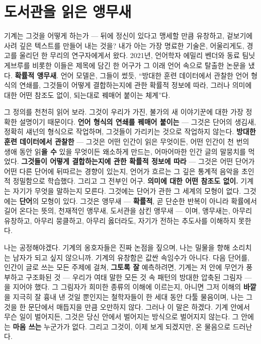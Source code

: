 \section*{도서관을 읽은 앵무새}

기계는 그것을 어떻게 하는가 — 뒤에 정신이 있다고 맹세할 만큼 유창하고, 겉보기에 사려 깊은 텍스트를 만들어 내는 것을? 내가 아는 가장 명료한 기술은, 어울리게도, 경고를 울리던 한 무리의 연구자에게서 왔다. 2021년, 언어학자 에밀리 벤더와 동료 팀닛 게브루를 비롯한 이들은 제목에 담긴 한 어구가 그 이래 언어 속으로 탈출한 논문을 냈다. \textbf{확률적 앵무새}. 언어 모델은, 그들이 썼듯, ``방대한 훈련 데이터에서 관찰한 언어 형식의 연쇄를, 그것들이 어떻게 결합하는지에 관한 확률적 정보에 따라, 그러나 의미에 대한 어떤 참조도 없이, 되는대로 꿰매어 붙이는 체계''다.

그 정의를 천천히 읽어 보라. 그것이 우리가 가진, 불가의 새 이야기꾼에 대한 가장 정확한 설명이기 때문이다. \textbf{언어 형식의 연쇄를 꿰매어 붙이는} — 그것은 단어의 생김새, 정확히 섀넌의 형식으로 작업하며, 그것들이 가리키는 것으로 작업하지 않는다. \textbf{방대한 훈련 데이터에서 관찰한} — 그것은 어떤 인간이 읽은 무엇이든, 어떤 인간이 천 번의 생애 동안 읽\textbf{을 수} 있을 무엇이든 왜소하게 만드는, 어마어마한 인간 글의 말뭉치를 먹었다. \textbf{그것들이 어떻게 결합하는지에 관한 확률적 정보에 따라} — 그것은 어떤 단어가 어떤 다른 단어에 뒤따르는 경향이 있는지, 언어가 흐르는 그 깊은 통계적 음악을 초인적 정밀함으로 학습했다. 그리고 그 전부인 어구. \textbf{의미에 대한 어떤 참조도 없이.} 기계는 자기가 무엇을 말하는지 모른다. 그것에는 단어가 관한 그 세계의 모형이 없다. 그것에는 \textbf{단어}의 모형이 있다. 그것은 앵무새 — \textbf{확률적}, 곧 단순한 반복이 아니라 확률에서 길어 온다는 뜻의, 천재적인 앵무새, 도서관을 삼킨 앵무새 — 이며, 앵무새는, 아무리 유창하고, 아무리 뭉클하고, 아무리 옳더라도, 자기가 전하는 추도사를 이해하지 못한다.

나는 공정해야겠다. 기계의 옹호자들은 진짜 논점을 짚으며, 나는 밀물을 향해 소리치는 남자가 되고 싶지 않으니까. 기계의 유창함은 값싼 속임수가 아니다. 다음 단어를, 인간이 글로 쓰는 모든 주제에 걸쳐, \textbf{그토록 잘} 예측하려면, 기계는 저 안에 무언가 풍부하고 구조화된 것 — 우리가 여태 말한 모든 것 속 패턴의 방대한 압축된 그림자 — 을 지어야 했다. 그 그림자가 희미한 종류의 이해에 이르는지, 아니면 그저 이해의 \textbf{바깥}을 지극히 잘 흉내 낸 것일 뿐인지는 철학자들이 한 세대 동안 다툴 물음이며, 나는 그것을 한 문단에서 매듭지을 만큼 오만하지 않다. 그러나 이 말은 하겠다. 기계 안에서 무슨 일이 벌어지든, 그것은 당신 안에서 벌어지는 방식으로 벌어지지 않는다. 그 안에는 \textbf{마음 쓰는} 누군가가 없다. 그리고 그것이, 이제 보게 되겠지만, 온 물음으로 드러난다.

